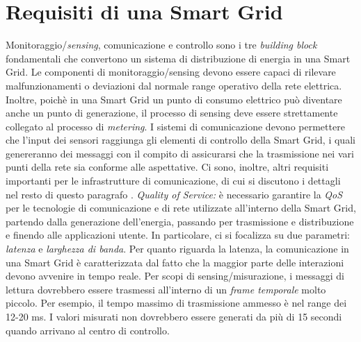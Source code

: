 \begin{figure}[h]
\end{figure}
\section{Requisiti di una Smart Grid}
Monitoraggio/\emph{sensing}, comunicazione e controllo sono i tre \emph{building block} fondamentali che convertono un sistema di distribuzione di energia in una Smart Grid. Le componenti di monitoraggio/sensing devono essere capaci di rilevare malfunzionamenti o deviazioni dal normale range operativo della rete elettrica. Inoltre, poichè in una Smart Grid un punto di consumo elettrico può diventare anche un punto di generazione, il processo di sensing deve essere strettamente collegato al processo di \emph{metering}. \newline
I sistemi di comunicazione devono permettere che l'input dei sensori raggiunga gli elementi di controllo della Smart Grid, i quali genereranno dei messaggi con il compito di assicurarsi che la trasmissione nei vari punti della rete sia conforme alle aspettative. Ci sono, inoltre, altri requisiti importanti per le infrastrutture di comunicazione, di cui si discutono i dettagli nel resto di questo paragrafo \cite{surveymotiv}.
\newline \newline
\textit{Quality of Service:} è necessario garantire la \emph{QoS} per le tecnologie di comunicazione e di rete utilizzate all'interno della Smart Grid, partendo dalla generazione dell'energia, passando per trasmissione e distribuzione e finendo alle applicazioni utente. In particolare, ci si focalizza su due parametri: \emph{latenza} e \emph{larghezza di banda}.\newline
Per quanto riguarda la latenza, la comunicazione in una Smart Grid è caratterizzata dal fatto che la maggior parte delle interazioni devono avvenire in tempo reale. Per scopi di sensing/misurazione, i messaggi di lettura dovrebbero essere trasmessi all'interno di un \emph{frame temporale} molto piccolo. Per esempio, il tempo massimo di trasmissione ammesso è nel range dei 12-20 ms. I valori misurati non dovrebbero essere generati da più di 15 secondi quando arrivano al centro di controllo. \newline
